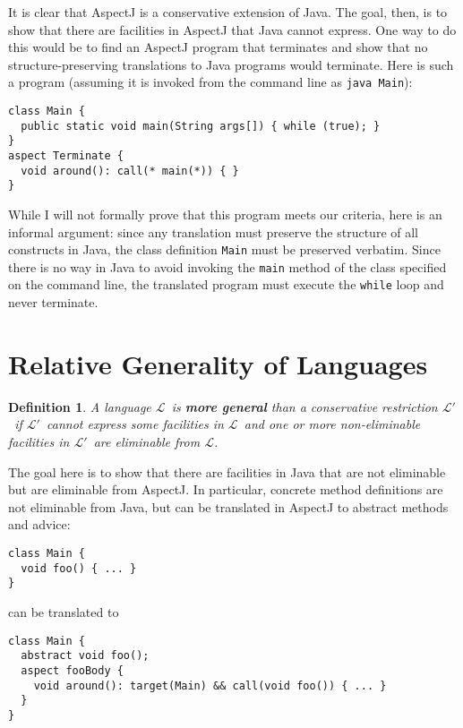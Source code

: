 \documentclass{article}
\newcommand{\defn}[1]{\textbf{#1}}
\newcommand{\code}[1]{\texttt{#1}}
\newcommand{\Lplain}{\ensuremath{\mathcal{L}}}
\newcommand{\Lprime}{\ensuremath{\Lplain'}}
\newtheorem{definition}{Definition}[section]
\begin{document}
It is clear that AspectJ is a conservative extension of Java.  The
goal, then, is to show that there are facilities in AspectJ that Java
cannot express.  One way to do this would be to find an AspectJ
program that terminates and show that no structure-preserving
translations to Java programs would terminate.  Here is such a program
(assuming it is invoked from the command line as \code{java Main}):

\begin{verbatim}
class Main {
  public static void main(String args[]) { while (true); }
}
aspect Terminate {
  void around(): call(* main(*)) { }
}
\end{verbatim}

While I will not formally prove that this program meets our criteria,
here is an informal argument: since any translation must preserve the
structure of all constructs in Java, the class definition \code{Main}
must be preserved verbatim.  Since there is no way in Java to avoid
invoking the \code{main} method of the class specified on the command
line, the translated program must execute the \code{while} loop and
never terminate.

\section{Relative Generality of Languages}
\label{generality}

\begin{definition}
A language \Lplain\ is \defn{more general} than a conservative
restriction \Lprime\ if \Lprime\ cannot express some facilities in
\Lplain\ and one or more non-eliminable facilities in \Lprime\ are
eliminable from \Lplain.
\end{definition}

The goal here is to show that there are facilities in Java that are
not eliminable but are eliminable from AspectJ.  In particular,
concrete method definitions are not eliminable from Java, but can be
translated in AspectJ to abstract methods and advice:

\begin{verbatim}
class Main {
  void foo() { ... }
}
\end{verbatim}

can be translated to

\begin{verbatim}
class Main {
  abstract void foo();
  aspect fooBody {
    void around(): target(Main) && call(void foo()) { ... }
  }
}
\end{verbatim}
\end{document}
